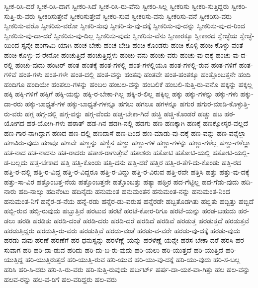 {ಸ್ವೀಕ-ರಿಸಿ-ದರೆ
ಸ್ವೀಕ-ರಿಸಿ-ದಾಗ
ಸ್ವೀಕರಿ-ಸಿದೆ
ಸ್ವೀಕ-ರಿಸಿ-ರು-ವೆನು
ಸ್ವೀಕರಿ-ಸಿಲ್ಲ
ಸ್ವೀಕರಿಸು
ಸ್ವೀಕರಿ-ಸುತ್ತಿದ್ದರು
ಸ್ವೀಕರಿ-ಸುತ್ತಿ-ರು-ವರು
ಸ್ವೀಕರಿಸುತ್ತೇನೆ
ಸ್ವೀಕರಿಸುತ್ತೇವೆ
ಸ್ವೀಕರಿ-ಸುವ
ಸ್ವೀಕರಿಸು-ವನು
ಸ್ವೀಕರಿಸು-ವನೆ
ಸ್ವೀಕರಿಸು-ವರು
ಸ್ವೀಕರಿಸು-ವರೊ
ಸ್ವೀಕರಿಸು-ವರೋ
ಸ್ವೀಕರಿ-ಸುವು
ಸ್ವೀಕರಿ-ಸು-ವು-ದಕ್ಕೆ
ಸ್ವೀಕರಿಸು-ವು-ದನ್ನು
ಸ್ವೀಕರಿಸು-ವು-ದ-ರಿಂದ
ಸ್ವೀಕರಿಸು-ವು-ದಾ-ದರೆ
ಸ್ವೀಕರಿಸು-ವು-ದಿಲ್ಲ
ಸ್ವೀಕರಿಸು-ವುದು
ಸ್ವೀಕರಿಸು-ವೆನು
ಸ್ವೀಕಾರಕ್ಕೂ
ಸ್ವೀಕಾರದ
ಸ್ವೇಚ್ಛೆಯ
ಸ್ವೇಚ್ಛೆ-ಯಿಂದ
ಸ್ಸನ್ನೇ
ಹಂಗಾಮಿ-ಯಾಗಿ
ಹಂಚ-ಬೇಕು
ಹಂಚ-ಬೇಡಿ
ಹಂಚಿ-ಕೊಂಡರು
ಹಂಚಿ-ಕೊಳ್ಳಿ
ಹಂಚಿ-ಕೊಳ್ಳು-ವಂತೆ
ಹಂಚಿ-ಕೊಳ್ಳು-ವ-ರೇನೋ
ಹಂಚುತ್ತಿದೆ
ಹಂಚುತ್ತಿದ್ದಳು
ಹಂಚು-ವನು
ಹಂಚು-ವರು
ಹಂಚು-ವು-ದಕ್ಕೆ
ಹಂಚು-ವು-ದ-ರಲ್ಲಿ
ಹಂಚು-ವುದು
ಹಂಟರ್
ಹಂತ
ಹಂತಕ್ಕೆ
ಹಂತ-ಗಳಲ್ಲಿ
ಹಂತ-ಗಳಲ್ಲಿಯೂ
ಹಂತ-ಗಳಲ್ಲಿ-ರುವ
ಹಂತ-ಗಳಿಗೆ
ಹಂತ-ಗಳಿವೆ
ಹಂತ-ಗಳು
ಹಂತ-ಗಳೇ
ಹಂತ-ದಲ್ಲಿ
ಹಂತ-ವನ್ನು
ಹಂತವು
ಹಂತವೇ
ಹಂತ-ಹಂತಕ್ಕೂ
ಹಂತ್ತೊಂಬತ್ತನೇ
ಹಂದಿ
ಹಂದಿಗೂ
ಹಂದಿಯೇ
ಹಂಪಲು-ಗಳನ್ನು
ಹಂಬಲ
ಹಂಬಲ-ವನ್ನು
ಹಂಬಲಿಕೆ
ಹಂಬಲಿ-ಸುತ್ತಿ-ರು-ವನೊ
ಹಕ್ಕನ್ನು
ಹಕ್ಕಲ್ಲ
ಹಕ್ಕಿ
ಹಕ್ಕಿ-ಗಳಿಗೆ
ಹಕ್ಕಿಗೆ
ಹಕ್ಕಿ-ಯನ್ನು
ಹಕ್ಕಿ-ರ-ಬೇಕಾ-ಗಿಲ್ಲ
ಹಕ್ಕಿ-ರ-ಲಿಲ್ಲ
ಹಕ್ಕಿಲ್ಲ
ಹಕ್ಕು
ಹಕ್ಕು-ಗಳನ್ನು
ಹಕ್ಕು-ಗಳು
ಹಕ್ಕು-ದಾ-ರರು
ಹಕ್ಕು-ಬಾಧ್ಯತೆ-ಗಳ
ಹಕ್ಕು-ಬಾಧ್ಯತೆ-ಗಳನ್ನೂ
ಹಗಲು
ಹಗಲೂ
ಹಗಳನ್ನೂ
ಹಗುರ
ಹಗುರ-ಮಾಡಿ-ಕೊಳ್ಳುತ್ತಿ-ರು-ವರು
ಹಗ್ಗ
ಹಗ್ಗ-ದಲ್ಲಿ
ಹಗ್ಗ-ವನ್ನು
ಹಗ್ಗ-ವೆಂದು
ಹಚ್ಚ-ಬೇಕಾ-ಗಿದೆ
ಹಚ್ಚಿ
ಹಚ್ಚಿ-ಕೊಂಡರೆ
ಹಚ್ಚು
ಹಟ
ಹಠ-ಯೋಗದ
ಹಠ-ಯೋಗಿ-ಗಳು
ಹಠಾತ್
ಹಡ-ಗಿನ
ಹಡಗಿ-ನಲ್ಲಿ
ಹಡಗು
ಹಣ
ಹಣಕ್ಕಾಗಿ
ಹಣಕ್ಕೆ
ಹಣಕ್ಕೋಸ್ಕರ-ವಲ್ಲದೆ
ಹಣ-ಗಾರ-ನಾಗಿದ್ದಾಗ
ಹಣದ
ಹಣ-ದಲ್ಲಿ
ಹಣದಾಸೆ
ಹಣ-ದಿಂದ
ಹಣ-ಮಾಡು-ವು-ದಕ್ಕೆ
ಹಣ-ವನ್ನು
ಹಣ-ವನ್ನೆಲ್ಲಾ
ಹಣವಿರು-ವುದು
ಹಣವೂ
ಹಣವೇ
ಹಣ್ಣನ್ನು
ಹಣ್ಣಿನ
ಹಣ್ಣು
ಹಣ್ಣು-ಗಳ
ಹಣ್ಣು-ಗಳನ್ನು
ಹಣ್ಣು-ಗಳೆಲ್ಲ
ಹಣ್ಣು-ಗಳೆಲ್ಲಾ
ಹತ-ನಾದ
ಹತ-ನಾದನು
ಹತ-ರಾದರು
ಹತಾಶ-ರಾಗುತ್ತೇವೆ
ಹತಾಶರು
ಹತೋಟಿ
ಹತೋಟಿ-ಯಲ್ಲಿ
ಹತೋಟಿ-ಯಲ್ಲಿ-ಡ-ಬಲ್ಲದು
ಹತ್ತ-ಬೇಕಾದ
ಹತ್ತಿ
ಹತ್ತಿ-ಕೊಂಡು
ಹತ್ತಿ-ದನು
ಹತ್ತಿ-ದರೆ
ಹತ್ತಿರ
ಹತ್ತಿ-ರ-ತೆಗೆ-ದು-ಕೊಂಡು
ಹತ್ತಿ-ರದ
ಹತ್ತಿ-ರ-ದಲ್ಲಿ
ಹತ್ತಿ-ರ-ವಿದ್ದ
ಹತ್ತಿ-ರ-ವಿದ್ದರೂ
ಹತ್ತಿ-ರ-ವಿದ್ದು
ಹತ್ತಿ-ರ-ವಿರುವ
ಹತ್ತಿ-ರವೇ
ಹತ್ತಿಸಿ
ಹತ್ತು
ಹತ್ತು-ವು-ದಕ್ಕೆ
ಹತ್ತು-ಸಾ-ವಿರ
ಹತ್ತೊಂಬತ್ತ-ನೆಯ
ಹತ್ತೊಂಬತ್ತನೇ
ಹತ್ತೊಂಬತ್ತು
ಹತ್ಯಾ
ಹಥ್ತಿರ
ಹದ-ಗೆಟ್ಟಿಲ್ಲ
ಹದ-ಗೆಡು-ವುದು
ಹದಿ-ನಾರು
ಹದಿ-ನಾಲ್ಕು
ಹದಿನೆಂಟು
ಹದಿನೈದು
ಹನುಮಂತ
ಹನುಮಂತನ
ಹನುಮಂತ-ನನ್ನು
ಹನುಮಂತ-ನಿಂದ
ಹನುಮಂತ-ನಿಗೆ
ಹನ್ನೆರ-ಡ-ನೆಯ
ಹನ್ನೆ-ರಡು
ಹನ್ನೆರ-ಡು-ವರುಷ
ಹನ್ನೆರಡೇ
ಹಬ್ಬತೊಡಗಿತು
ಹಬ್ಬಿತು
ಹಬ್ಬಿತ್ತು
ಹಬ್ಬಿದೆ
ಹಬ್ಬಿ-ರುವ
ಹಬ್ಬಿ-ರುವುದು
ಹಬ್ಬುತ್ತಿವೆ
ಹರಟುವ
ಹರಟೆ
ಹರಟೆ-ಕೋರ-ರಿಗೂ
ಹರಟೆ-ಯನ್ನು
ಹರಡ-ಬಹುದು
ಹರ-ಡಲು
ಹರಡಿ
ಹರಡಿತು
ಹರಡಿ-ದಂತೆ
ಹರಡಿ-ದರು
ಹರಡಿ-ದರೆ
ಹರಡಿದೆ
ಹರಡಿವೆ
ಹರಡುತ್ತ
ಹರಡುತ್ತದೆ
ಹರಡುತ್ತವೆ
ಹರಡುತ್ತಿದ್ದರು
ಹರಡುತ್ತಿ-ರು-ವರು
ಹರಡುತ್ತಿವೆ
ಹರಡು-ವಂತೆ
ಹರಡು-ವ-ವರೇ
ಹರಡು-ವು-ದಕ್ಕೆ
ಹರಡು-ವುದು
ಹರಡು-ವುವು
ಹರಣೆ
ಹರಣೆಗೆ
ಹರ-ಧನುಸ್ಸನ್ನು
ಹರಳೆಣ್ಣೆ-ಯನ್ನು
ಹರಳೆಣ್ಣೆ-ಯನ್ನೇ
ಹರಸ-ಬೇಕಾ-ದರೆ
ಹರಸಿ
ಹರ-ಸುವಾಗ
ಹರಿ
ಹರಿ-ದಾ-ಡುವ
ಹರಿದು
ಹರಿ-ದು-ಬ-ರು-ವುದು
ಹರಿ-ಯಲು
ಹರಿ-ಯುತ್ತದೆ
ಹರಿ-ಯುತ್ತಿದೆ
ಹರಿ-ಯುತ್ತಿದ್ದ
ಹರಿ-ಯುತ್ತಿರುತ್ತದೆ
ಹರಿ-ಯುತ್ತಿ-ರುವ
ಹರಿ-ಯುವ
ಹರಿ-ಯು-ವು-ದಕ್ಕೆ
ಹರಿ-ಯು-ವುದು
ಹರಿ-ಸ-ಬಲ್ಲ
ಹರಿಸಿ
ಹರಿ-ಸಿ-ದರು
ಹರಿ-ಸಿ-ರು-ವರು
ಹರಿ-ಸುತ್ತಿ-ರುವುದು
ಹರ್ಬರ್ಟ್
ಹರ್ಷ-ದಾ-ಯಕ-ವಾ-ಗಿತ್ತು
ಹಲ
ಹಲ-ವನ್ನು
ಹಲವ-ರನ್ನು
ಹಲ-ವ-ರಿಗೆ
ಹಲ-ವರಿದ್ದರು
ಹಲ-ವರು
}
